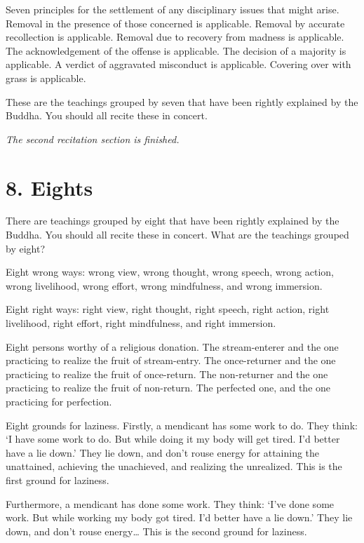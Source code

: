 \documentclass[12pt,openany]{book}%
\newcommand*{\scendsection}[1]{\begin{center}\textit{#1}\end{center}}
\begin{document}
Seven principles for the settlement of any disciplinary issues that might arise. Removal in the presence of those concerned is applicable. Removal by accurate recollection is applicable. Removal due to recovery from madness is applicable. The acknowledgement of the offense is applicable. The decision of a majority is applicable. A verdict of aggravated misconduct is applicable. Covering over with grass is applicable. 

These are the teachings grouped by seven that have been rightly explained by the Buddha. You should all recite these in concert. 

\scendsection{The second recitation section is finished. }

\section*{8. Eights }

There are teachings grouped by eight that have been rightly explained by the Buddha. You should all recite these in concert. What are the teachings grouped by eight? 

Eight wrong ways: wrong view, wrong thought, wrong speech, wrong action, wrong livelihood, wrong effort, wrong mindfulness, and wrong immersion. 

Eight right ways: right view, right thought, right speech, right action, right livelihood, right effort, right mindfulness, and right immersion. 

Eight persons worthy of a religious donation. The stream-enterer and the one practicing to realize the fruit of stream-entry. The once-returner and the one practicing to realize the fruit of once-return. The non-returner and the one practicing to realize the fruit of non-return. The perfected one, and the one practicing for perfection. 

Eight grounds for laziness. Firstly, a mendicant has some work to do. They think: ‘I have some work to do. But while doing it my body will get tired. I’d better have a lie down.’ They lie down, and don’t rouse energy for attaining the unattained, achieving the unachieved, and realizing the unrealized. This is the first ground for laziness. 

Furthermore, a mendicant has done some work. They think: ‘I’ve done some work. But while working my body got tired. I’d better have a lie down.’ They lie down, and don’t rouse energy… This is the second ground for laziness. 
\end{document}
